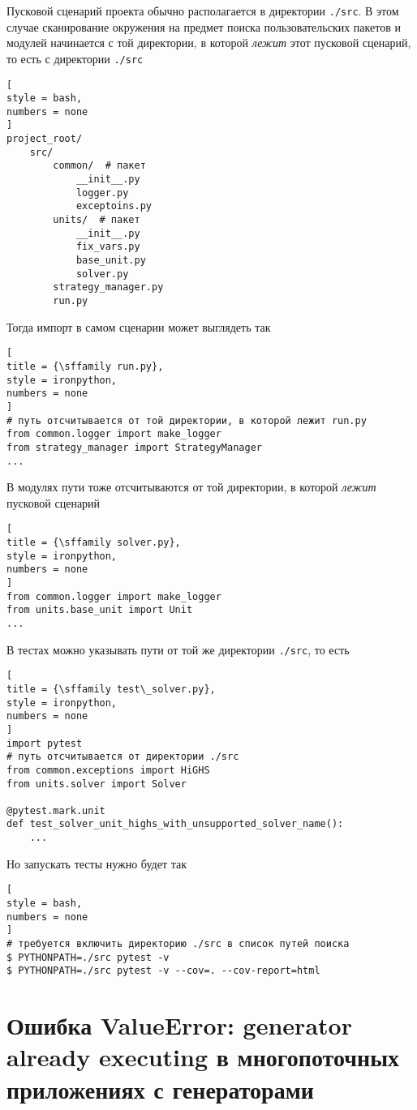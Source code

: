 \documentclass[%
	11pt,
	a4paper,
	utf8,
		]{article}
\begin{document}
Пусковой сценарий проекта обычно располагается в директории \verb|./src|. В этом случае сканирование окружения на предмет поиска пользовательских пакетов и модулей начинается с той директории, в которой \emph{лежит} этот пусковой сценарий, то есть с директории \verb|./src|
\begin{lstlisting}[
style = bash,
numbers = none
]
project_root/
    src/
        common/  # пакет
            __init__.py
            logger.py
            exceptoins.py
        units/  # пакет
            __init__.py
            fix_vars.py
            base_unit.py
            solver.py
        strategy_manager.py
        run.py
\end{lstlisting}

Тогда импорт в самом сценарии может выглядеть так
\begin{lstlisting}[
title = {\sffamily run.py},
style = ironpython,
numbers = none
]
# путь отсчитывается от той директории, в которой лежит run.py
from common.logger import make_logger
from strategy_manager import StrategyManager
...
\end{lstlisting}

В модулях пути тоже отсчитываются от той директории, в которой \emph{лежит} пусковой сценарий
\begin{lstlisting}[
title = {\sffamily solver.py},
style = ironpython,
numbers = none
]
from common.logger import make_logger
from units.base_unit import Unit
...
\end{lstlisting}

В тестах можно указывать пути от той же директории \verb|./src|, то есть
\begin{lstlisting}[
title = {\sffamily test\_solver.py},
style = ironpython,
numbers = none
]
import pytest
# путь отсчитывается от директории ./src
from common.exceptions import HiGHS
from units.solver import Solver

@pytest.mark.unit
def test_solver_unit_highs_with_unsupported_solver_name():
    ...
\end{lstlisting}

Но запускать тесты нужно будет так
\begin{lstlisting}[
style = bash,
numbers = none
]
# требуется включить директорию ./src в список путей поиска
$ PYTHONPATH=./src pytest -v
$ PYTHONPATH=./src pytest -v --cov=. --cov-report=html
\end{lstlisting}

\section{Ошибка ValueError: generator already executing в многопоточных приложениях с генераторами}
\end{document}
